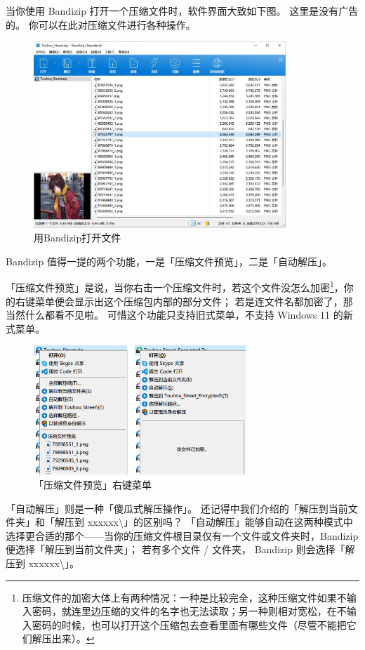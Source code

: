 当你使用 Bandizip 打开一个压缩文件时，软件界面大致如下图。
这里是没有广告的。
你可以在此对压缩文件进行各种操作。

\begin{figure}[htb!]
  \centering
  \includegraphics[width=9.5cm]{assets/Bandizip_View.jpg}
  \caption{用Bandizip打开文件}
  \label{Bandizip_View}
\end{figure}

Bandizip 值得一提的两个功能，一是「压缩文件预览」，二是「自动解压」。

「压缩文件预览」是说，当你右击一个压缩文件时，若这个文件没怎么加密\footnote{压缩文件的加密大体上有两种情况：一种是比较完全，这种压缩文件如果不输入密码，就连里边压缩的文件的名字也无法读取；另一种则相对宽松，在不输入密码的时候，也可以打开这个压缩包去查看里面有哪些文件（尽管不能把它们解压出来）。}，你的右键菜单便会显示出这个压缩包内部的部分文件；
若是连文件名都加密了，那当然什么都看不见啦。
可惜这个功能只支持旧式菜单，不支持 Windows 11 的新式菜单。

\begin{figure}[htb!]
  \centering
  \includegraphics[width=8cm]{assets/Compressed_Preview.jpg}
  \caption{「压缩文件预览」右键菜单}
  \label{Compressed_Preview}
\end{figure}

「自动解压」则是一种「傻瓜式解压操作」。
还记得中我们介绍的「解压到当前文件夹」和「解压到 xxxxxx\textbackslash 」的区别吗？
「自动解压」能够自动在这两种模式中选择更合适的那个——当你的压缩文件根目录仅有一个文件或文件夹时，Bandizip 便选择「解压到当前文件夹」；
若有多个文件 / 文件夹， Bandizip 则会选择「解压到 xxxxxx\textbackslash」。

